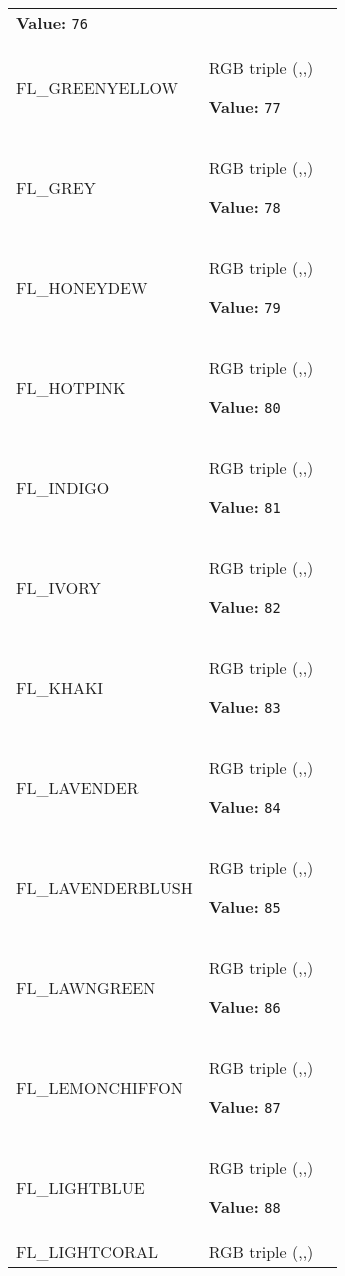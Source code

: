 \begin{longtable}{|p{\varnamewidth}|p{\vardescrwidth}|l}
\textbf{Value:} 
{\tt 76}&\\
\cline{1-2}
\raggedright F\-L\-\_\-G\-R\-E\-E\-N\-Y\-E\-L\-L\-O\-W\- & \raggedright RGB triple (,,)

\textbf{Value:} 
{\tt 77}&\\
\cline{1-2}
\raggedright F\-L\-\_\-G\-R\-E\-Y\- & \raggedright RGB triple (,,)

\textbf{Value:} 
{\tt 78}&\\
\cline{1-2}
\raggedright F\-L\-\_\-H\-O\-N\-E\-Y\-D\-E\-W\- & \raggedright RGB triple (,,)

\textbf{Value:} 
{\tt 79}&\\
\cline{1-2}
\raggedright F\-L\-\_\-H\-O\-T\-P\-I\-N\-K\- & \raggedright RGB triple (,,)

\textbf{Value:} 
{\tt 80}&\\
\cline{1-2}
\raggedright F\-L\-\_\-I\-N\-D\-I\-G\-O\- & \raggedright RGB triple (,,)

\textbf{Value:} 
{\tt 81}&\\
\cline{1-2}
\raggedright F\-L\-\_\-I\-V\-O\-R\-Y\- & \raggedright RGB triple (,,)

\textbf{Value:} 
{\tt 82}&\\
\cline{1-2}
\raggedright F\-L\-\_\-K\-H\-A\-K\-I\- & \raggedright RGB triple (,,)

\textbf{Value:} 
{\tt 83}&\\
\cline{1-2}
\raggedright F\-L\-\_\-L\-A\-V\-E\-N\-D\-E\-R\- & \raggedright RGB triple (,,)

\textbf{Value:} 
{\tt 84}&\\
\cline{1-2}
\raggedright F\-L\-\_\-L\-A\-V\-E\-N\-D\-E\-R\-B\-L\-U\-S\-H\- & \raggedright RGB triple (,,)

\textbf{Value:} 
{\tt 85}&\\
\cline{1-2}
\raggedright F\-L\-\_\-L\-A\-W\-N\-G\-R\-E\-E\-N\- & \raggedright RGB triple (,,)

\textbf{Value:} 
{\tt 86}&\\
\cline{1-2}
\raggedright F\-L\-\_\-L\-E\-M\-O\-N\-C\-H\-I\-F\-F\-O\-N\- & \raggedright RGB triple (,,)

\textbf{Value:} 
{\tt 87}&\\
\cline{1-2}
\raggedright F\-L\-\_\-L\-I\-G\-H\-T\-B\-L\-U\-E\- & \raggedright RGB triple (,,)

\textbf{Value:} 
{\tt 88}&\\
\cline{1-2}
\raggedright F\-L\-\_\-L\-I\-G\-H\-T\-C\-O\-R\-A\-L\- & \raggedright RGB triple (,,)


\end{longtable}
